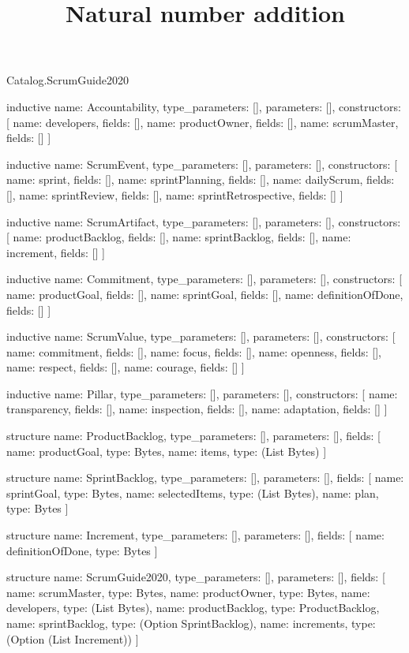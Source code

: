 \begin{lexlean}{Catalog.ScrumGuide2020}
\title{Natural number addition}
\begin{semanticmodule}
inductive{
  name: Accountability,
  type_parameters: [],
  parameters: [],
  constructors: [
    {name: developers, fields: []},
    {name: productOwner, fields: []},
    {name: scrumMaster, fields: []}
  ]
}

inductive{
  name: ScrumEvent,
  type_parameters: [],
  parameters: [],
  constructors: [
    {name: sprint, fields: []},
    {name: sprintPlanning, fields: []},
    {name: dailyScrum, fields: []},
    {name: sprintReview, fields: []},
    {name: sprintRetrospective, fields: []}
  ]
}

inductive{
  name: ScrumArtifact,
  type_parameters: [],
  parameters: [],
  constructors: [
    {name: productBacklog, fields: []},
    {name: sprintBacklog, fields: []},
    {name: increment, fields: []}
  ]
}

inductive{
  name: Commitment,
  type_parameters: [],
  parameters: [],
  constructors: [
    {name: productGoal, fields: []},
    {name: sprintGoal, fields: []},
    {name: definitionOfDone, fields: []}
  ]
}

inductive{
  name: ScrumValue,
  type_parameters: [],
  parameters: [],
  constructors: [
    {name: commitment, fields: []},
    {name: focus, fields: []},
    {name: openness, fields: []},
    {name: respect, fields: []},
    {name: courage, fields: []}
  ]
}

inductive{
  name: Pillar,
  type_parameters: [],
  parameters: [],
  constructors: [
    {name: transparency, fields: []},
    {name: inspection, fields: []},
    {name: adaptation, fields: []}
  ]
}

structure{
  name: ProductBacklog,
  type_parameters: [],
  parameters: [],
  fields: [
    {name: productGoal, type: Bytes},
    {name: items, type: (List Bytes)}
  ]
}

structure{
  name: SprintBacklog,
  type_parameters: [],
  parameters: [],
  fields: [
    {name: sprintGoal, type: Bytes},
    {name: selectedItems, type: (List Bytes)},
    {name: plan, type: Bytes}
  ]
}

structure{
  name: Increment,
  type_parameters: [],
  parameters: [],
  fields: [
    {name: definitionOfDone, type: Bytes}
  ]
}

structure{
  name: ScrumGuide2020,
  type_parameters: [],
  parameters: [],
  fields: [
    {name: scrumMaster, type: Bytes},
    {name: productOwner, type: Bytes},
    {name: developers, type: (List Bytes)},
    {name: productBacklog, type: ProductBacklog},
    {name: sprintBacklog, type: (Option SprintBacklog)},
    {name: increments, type: (Option (List Increment))}
  ]
}
\end{semanticmodule}
\end{lexlean}
